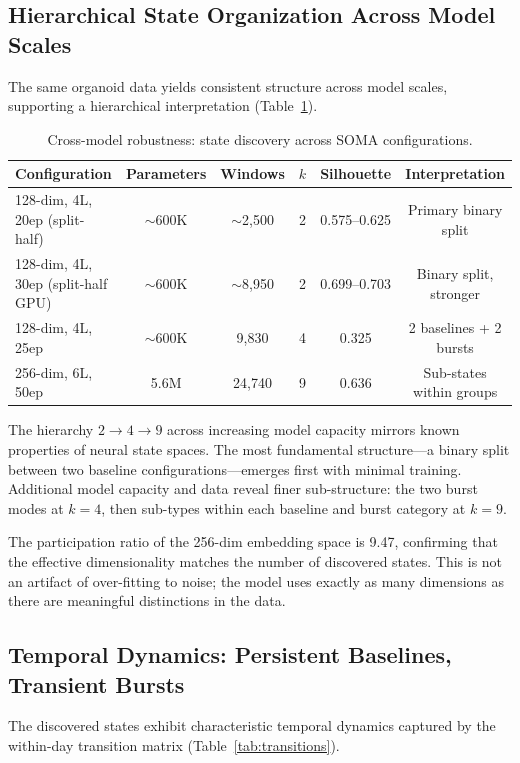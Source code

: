 \documentclass{article}
\begin{document}
\subsection{Hierarchical State Organization Across Model Scales}

The same organoid data yields consistent structure across model scales, supporting a hierarchical interpretation (Table~\ref{tab:hierarchy}).

\begin{table}[h]
\centering
\caption{Cross-model robustness: state discovery across SOMA configurations.}
\label{tab:hierarchy}
\begin{tabular}{@{}lccccc@{}}
\toprule
Configuration & Parameters & Windows & $k$ & Silhouette & Interpretation \\
\midrule
128-dim, 4L, 20ep (split-half) & $\sim$600K & $\sim$2,500 & 2 & 0.575--0.625 & Primary binary split \\
128-dim, 4L, 30ep (split-half GPU) & $\sim$600K & $\sim$8,950 & 2 & 0.699--0.703 & Binary split, stronger \\
128-dim, 4L, 25ep & $\sim$600K & 9,830 & 4 & 0.325 & 2 baselines + 2 bursts \\
256-dim, 6L, 50ep & 5.6M & 24,740 & 9 & 0.636 & Sub-states within groups \\
\bottomrule
\end{tabular}
\end{table}

The hierarchy $2 \rightarrow 4 \rightarrow 9$ across increasing model capacity mirrors known properties of neural state spaces. The most fundamental structure---a binary split between two baseline configurations---emerges first with minimal training. Additional model capacity and data reveal finer sub-structure: the two burst modes at $k=4$, then sub-types within each baseline and burst category at $k=9$.

The participation ratio of the 256-dim embedding space is 9.47, confirming that the effective dimensionality matches the number of discovered states. This is not an artifact of over-fitting to noise; the model uses exactly as many dimensions as there are meaningful distinctions in the data.

\subsection{Temporal Dynamics: Persistent Baselines, Transient Bursts}

The discovered states exhibit characteristic temporal dynamics captured by the within-day transition matrix (Table~\ref{tab:transitions}).
\end{document}

